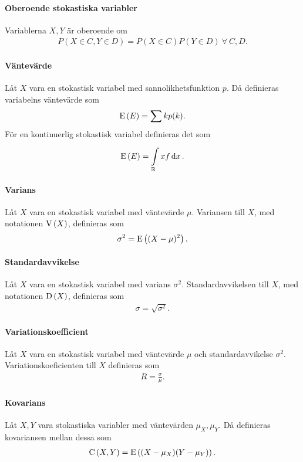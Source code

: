 \paragraph{Oberoende stokastiska variabler}
Variablerna $X, Y$ är oberoende om
\begin{align*}
	P(X\in C, Y\in D) = P(X\in C)P(Y\in D)\ \forall\ C, D.
\end{align*}

\paragraph{Väntevärde}
Låt $X$ vara en stokastisk variabel med sannolikhetsfunktion $p$. Då definieras variabelns väntevärde som
\begin{align*}
	\text{E}\left(E\right) = \sum kp(k).
\end{align*}
För en kontinuerlig stokastisk variabel definieras det som
\begin{align*}
	\text{E}\left(E\right) = \int\limits_{\mathbb{R}}^{}xf\dd{x}.
\end{align*}

\paragraph{Varians}
Låt $X$ vara en stokastisk variabel med väntevärde $\mu$. Variansen till $X$, med notationen $\text{V}\left(X\right)$, definieras som
\begin{align*}
	\sigma^2 = \text{E}\left((X - \mu)^2\right).
\end{align*}

\paragraph{Standardavvikelse}
Låt $X$ vara en stokastisk variabel med varians $\sigma^2$. Standardavvikelsen till $X$, med notationen $\text{D}\left(X\right)$, definieras som
\begin{align*}
	\sigma = \sqrt{\sigma^2}.
\end{align*}

\paragraph{Variationskoefficient}
Låt $X$ vara en stokastisk variabel med väntevärde $\mu$ och standardavvikelse $\sigma^2$. Variationskoeficienten till $X$ definieras som
\begin{align*}
	R = \frac{\sigma}{\mu}.
\end{align*}

\paragraph{Kovarians}
Låt $X, Y$ vara stokastiska variabler med väntevärden $\mu_{X}, \mu_{Y}$. Då definieras kovariansen mellan dessa som
\begin{align*}
	\text{C}\left(X, Y\right) = \text{E}\left((X - \mu_{X})(Y - \mu_{Y})\right).
\end{align*}

